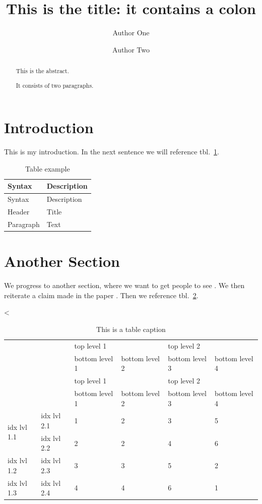 \documentclass[
]{article}
\title{This is the title: it contains a colon}
\author{Author One \and Author Two}
\date{}
\begin{document}
\maketitle
\begin{abstract}
This is the abstract.

It consists of two paragraphs.
\end{abstract}

\hypertarget{introduction}{%
\section{Introduction}\label{introduction}}

This is my introduction. In the next sentence we will reference
tbl.~\ref{tbl:table1}.

\hypertarget{tbl:table1}{}
\begin{longtable}[]{@{}ll@{}}
\caption{\label{tbl:table1}Table example}\tabularnewline
\toprule
Syntax & Description \\
\midrule
\endfirsthead
\toprule
Syntax & Description \\
\midrule
\endhead
Header & Title \\
Paragraph & Text \\
\bottomrule
\end{longtable}

\hypertarget{another-section}{%
\section{Another Section}\label{another-section}}

We progress to another section, where we want to get people to see
\textcite{bhatt_linear_2006}. We then reiterate a claim made in the
paper \autocite{bhatt_linear_2006}. Then we reference
tbl.~\ref{tbl:table2}.

\textless{}

\hypertarget{tbl:table2}{}
\begin{longtable}[]{@{}llllll@{}}
\caption{\label{tbl:table2}This is a table caption}\tabularnewline
\toprule
& & \multicolumn{2}{l}{top level 1} & \multicolumn{2}{l}{top level 2} \\
& & bottom level 1 & bottom level 2 & bottom level 3 & bottom level 4 \\
\midrule
\endfirsthead
\toprule
& & \multicolumn{2}{l}{top level 1} & \multicolumn{2}{l}{top level 2} \\
& & bottom level 1 & bottom level 2 & bottom level 3 & bottom level 4 \\
\midrule
\endhead
\multirow{2}{*}{idx lvl 1.1} & idx lvl 2.1 & 1 & 2 & 3 & 5 \\
& idx lvl 2.2 & 2 & 2 & 4 & 6 \\
idx lvl 1.2 & idx lvl 2.3 & 3 & 3 & 5 & 2 \\
idx lvl 1.3 & idx lvl 2.4 & 4 & 4 & 6 & 1 \\
\bottomrule
\end{longtable}
\end{document}
